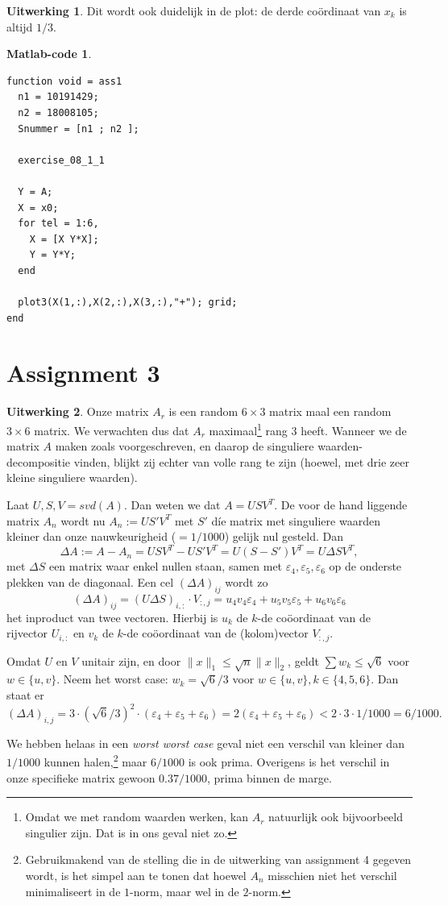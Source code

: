 \documentclass[11pt]{amsart}
\theoremstyle{definition}
\newtheorem*{uitwerking}{Uitwerking}
\newtheorem*{matlab}{Matlab-code}
\newcommand{\e}{\varepsilon}
\begin{document}
\begin{uitwerking}
  Dit wordt ook duidelijk in de plot: de derde co\"ordinaat van $x_k$ is altijd $1/3$.
\end{uitwerking}

\begin{matlab}~

  \begin{verbatim}
function void = ass1
  n1 = 10191429;
  n2 = 18008105;
  Snummer = [n1 ; n2 ];

  exercise_08_1_1

  Y = A;
  X = x0;
  for tel = 1:6,
    X = [X Y*X];
    Y = Y*Y;
  end

  plot3(X(1,:),X(2,:),X(3,:),"+"); grid;
end
\end{verbatim}
\end{matlab}

\section*{Assignment 3}
\begin{uitwerking}
  Onze matrix $A_r$ is een random $6 \times 3$ matrix maal een random $3 \times 6$ matrix. We verwachten dus dat $A_r$ maximaal\footnote{Omdat we met random waarden werken, kan $A_r$ natuurlijk ook bijvoorbeeld singulier zijn. Dat is in ons geval niet zo.} rang 3 heeft. Wanneer we de matrix $A$ maken zoals voorgeschreven, en daarop de singuliere waarden-decompositie vinden, blijkt zij echter van volle rang te zijn (hoewel, met drie zeer kleine singuliere waarden).

  Laat $U, S, V = svd(A)$. Dan weten we dat $A = U S V^T$. De voor de hand liggende matrix $A_n$ wordt nu $A_n := U S' V^T$ met $S'$ d\'ie matrix met singuliere waarden kleiner dan onze nauwkeurigheid ($= 1/1000$) gelijk nul gesteld. Dan
  \[
    \Delta A := A - A_n = U S V^T - U S' V^T = U(S - S')V^T = U \Delta S V^T,
  \]
  met $\Delta S$ een matrix waar enkel nullen staan, samen met $\e_4, \e_5, \e_6$ op de onderste plekken van de diagonaal. Een cel $(\Delta A)_{ij}$ wordt zo
  \[
    (\Delta A)_{ij} = (U \Delta S)_{i,:} \cdot V_{:,j} = u_4 v_4 \e_4 + u_5 v_5 \e_5 + u_6 v_6 \e_6
  \]
  het inproduct van twee vectoren. Hierbij is $u_k$ de $k$-de co\"oordinaat van de rijvector $U_{i,:}$ en $v_k$ de $k$-de co\"oordinaat van de (kolom)vector $V_{:,j}$.

  Omdat $U$ en $V$ unitair zijn, en door $\|x \|_1 \leq \sqrt{n} \|x\|_2$, geldt $\sum w_k \leq \sqrt{6}$ voor $w \in \{u, v\}$. Neem het worst case: $w_k = \sqrt{6}/3$ voor $w \in \{u, v\}, k \in \{4, 5, 6\}$. Dan staat er
  \[
    (\Delta A)_{i,j} = 3 \cdot (\sqrt{6}/3)^2 \cdot (\e_4 + \e_5 + \e_6) = 2 (\e_4 + \e_5 + \e_6) < 2 \cdot 3 \cdot 1/1000 = 6/1000.
  \]
  
  We hebben helaas in een \emph{worst worst case} geval niet een verschil van kleiner dan $1/1000$ kunnen halen,\footnote{Gebruikmakend van de stelling die in de uitwerking van assignment 4 gegeven wordt, is het simpel aan te tonen dat hoewel $A_n$ misschien niet het verschil minimaliseert in de $1$-norm, maar wel in de $2$-norm.} maar $6/1000$ is ook prima. Overigens is het verschil in onze specifieke matrix gewoon $0.37/1000$, prima binnen de marge.
\end{uitwerking}
\end{document}
